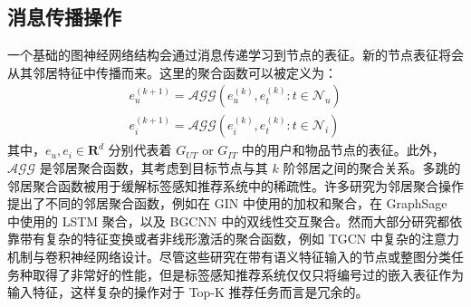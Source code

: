 \subsection{消息传播操作}
一个基础的图神经网络结构会通过消息传递学习到节点的表征\cite{kipf_gcn_2017}。新的节点表征将会从其邻居特征中传播而来。这里的聚合函数可以被定义为：
\begin{equation}
    \begin{aligned}
        e_{u}^{(k+1)} = \mathcal{AGG}(e_{u}^{(k)}, {e_t^{(k)}: t \in \mathcal{N}_{u}}) \\
        e_{i}^{(k+1)} = \mathcal{AGG}(e_{i}^{(k)}, {e_t^{(k)}: t \in \mathcal{N}_{i}})
    \end{aligned}
\end{equation}
其中，$e_{u}, e_{i} \in \mathbf{R}^d$ 分别代表着 $G_{UT}$ or $G_{IT}$ 中的用户和物品节点的表征。此外，$\mathcal{AGG}$ 是邻居聚合函数，其考虑到目标节点与其 $k$ 阶邻居之间的聚合关系。多跳的邻居聚合函数被用于缓解标签感知推荐系统中的稀疏性\cite{chen_tgcn_2020}。许多研究为邻居聚合操作提出了不同的邻居聚合函数，例如在 GIN\cite{chen_tgcn_2020} 中使用的加权和聚合，在 GraphSage\cite{hamilton_graphsage_2017} 中使用的 LSTM 聚合，以及 BGCNN\cite{zhu_bgnn_2020} 中的双线性交互聚合。然而大部分研究都依靠带有复杂的特征变换或者非线形激活的聚合函数，例如 TGCN 中复杂的注意力机制与卷积神经网络设计。尽管这些研究在带有语义特征输入的节点或整图分类任务种取得了非常好的性能，但是标签感知推荐系统仅仅只将编号过的嵌入表征作为输入特征，这样复杂的操作对于 Top-K 推荐任务而言是冗余的。

